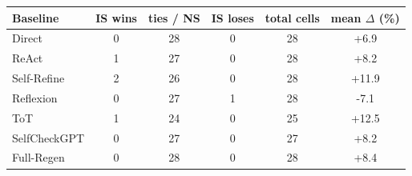 \begin{tabular}{lccccc}
\toprule
Baseline & IS wins & ties / NS & IS loses & total cells & mean $\Delta$ (\%) \\
\midrule
Direct & 0 & 28 & 0 & 28 & +6.9 \\
ReAct & 1 & 27 & 0 & 28 & +8.2 \\
Self-Refine & 2 & 26 & 0 & 28 & +11.9 \\
Reflexion & 0 & 27 & 1 & 28 & -7.1 \\
ToT & 1 & 24 & 0 & 25 & +12.5 \\
SelfCheckGPT & 0 & 27 & 0 & 27 & +8.2 \\
Full-Regen & 0 & 28 & 0 & 28 & +8.4 \\
\bottomrule
\end{tabular}